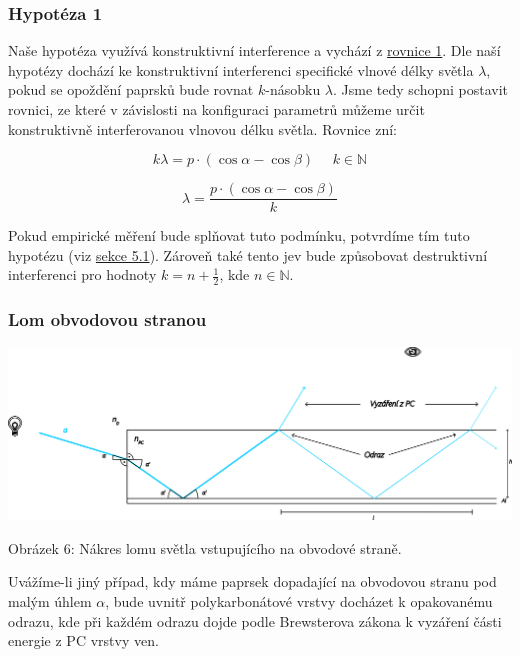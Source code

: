 \documentclass[titlepage]{article}
\begin{document}
\subsubsection{Hypotéza 1}
 \label{hyp:1}
Naše hypotéza využívá konstruktivní interference a vychází z \hyperref[eq1]{rovnice 1}.
Dle naší hypotézy dochází ke konstruktivní interferenci specifické vlnové délky světla $\lambda$, pokud se opoždění paprsků bude rovnat $k$-násobku $\lambda$.
Jsme tedy schopni postavit rovnici, ze které v závislosti na konfiguraci parametrů můžeme určit konstruktivně interferovanou vlnovou délku světla.
Rovnice zní:

\begin{equation}
    \label{eq2}
    k\lambda = p \cdot (\cos{\alpha} - \cos{\beta}) \ \ \ \ \ \  k \in \mathbb{N}
\end{equation}

\begin{equation}
    \label{eq3}
    \lambda = \frac{ p \cdot (\cos{\alpha} - \cos{\beta}) }{k}
\end{equation}

Pokud empirické měření bude splňovat tuto podmínku, potvrdíme tím tuto hypotézu (viz \hyperref[exp:1]{sekce 5.1}).
Zároveň také tento jev bude způsobovat destruktivní interferenci pro hodnoty $k = n + \frac{1}{2}$, kde $n \in \mathbb{N}$.

\subsubsection{Lom obvodovou stranou}

 \label{image:6}
\includegraphics[width=\textwidth]{repeatedrefelction.png}
\begin{center}
    Obrázek 6: Nákres lomu světla vstupujícího na obvodové straně.
\end{center}

Uvážíme-li jiný případ, kdy máme paprsek dopadající na obvodovou stranu pod malým úhlem $\alpha$, bude uvnitř polykarbonátové vrstvy docházet k opakovanému odrazu, kde při každém odrazu dojde podle Brewsterova zákona k vyzáření části energie z PC vrstvy ven.
\end{document}
